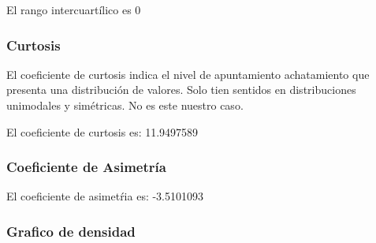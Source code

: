 \documentclass[
]{article}
\newenvironment{Shaded}{\begin{snugshade}}{\end{snugshade}}
\newcommand{\AttributeTok}[1]{\textcolor[rgb]{0.13,0.29,0.53}{#1}}
\newcommand{\CommentTok}[1]{\textcolor[rgb]{0.56,0.35,0.01}{\textit{#1}}}
\newcommand{\ConstantTok}[1]{\textcolor[rgb]{0.56,0.35,0.01}{#1}}
\newcommand{\FunctionTok}[1]{\textcolor[rgb]{0.13,0.29,0.53}{\textbf{#1}}}
\newcommand{\NormalTok}[1]{#1}
\newcommand{\OtherTok}[1]{\textcolor[rgb]{0.56,0.35,0.01}{#1}}
\newcommand{\SpecialCharTok}[1]{\textcolor[rgb]{0.81,0.36,0.00}{\textbf{#1}}}
\begin{document}
\begin{Shaded}
\end{Shaded}

El rango intercuartílico es 0

\hypertarget{curtosis}{%
\subsubsection{Curtosis}\label{curtosis}}

El coeficiente de curtosis indica el nivel de apuntamiento achatamiento
que presenta una distribución de valores. Solo tien sentidos en
distribuciones unimodales y simétricas. No es este nuestro caso.

\begin{Shaded}
\end{Shaded}

El coeficiente de curtosis es: 11.9497589

\hypertarget{coeficiente-de-asimetruxeda}{%
\subsubsection{Coeficiente de
Asimetría}\label{coeficiente-de-asimetruxeda}}

\begin{Shaded}
\end{Shaded}

El coeficiente de asimetŕia es: -3.5101093

\hypertarget{grafico-de-densidad}{%
\subsubsection{Grafico de densidad}\label{grafico-de-densidad}}
\end{document}
